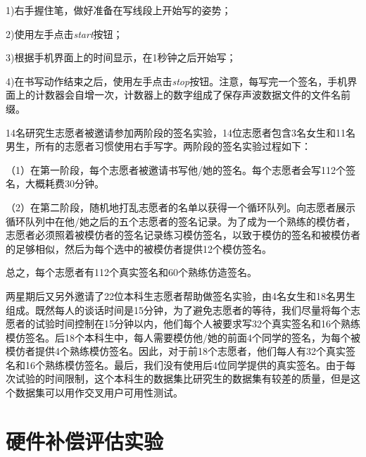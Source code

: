 1)右手握住笔，做好准备在写线段上开始写的姿势；

2)使用左手点击\textit{start}按钮；

3)根据手机界面上的时间显示，在1秒钟之后开始写；

4)在书写动作结束之后，使用左手点击\textit{stop}按钮。注意，每写完一个签名，手机界面上的计数器会自增一次，计数器上的数字组成了保存声波数据文件的文件名前缀。

14名研究生志愿者被邀请参加两阶段的签名实验，14位志愿者包含3名女生和11名男生，所有的志愿者习惯使用右手写字。两阶段的签名实验过程如下：

（1）在第一阶段，每个志愿者被邀请书写他/她的签名。每个志愿者会写112个签名，大概耗费30分钟。

（2）在第二阶段，随机地打乱志愿者的名单以获得一个循环队列。向志愿者展示循环队列中在他/她之后的五个志愿者的签名记录。为了成为一个熟练的模仿者，志愿者必须照着被模仿者的签名记录练习模仿签名，以致于模仿的签名和被模仿者的足够相似，然后为每个选中的被模仿者提供12个模仿签名。

总之，每个志愿者有112个真实签名和60个熟练仿造签名。

两星期后又另外邀请了22位本科生志愿者帮助做签名实验，由4名女生和18名男生组成。既然每人的谈话时间是15分钟，为了避免志愿者的等待，我们尽量将每个志愿者的试验时间控制在15分钟以内，他们每个人被要求写32个真实签名和16个熟练模仿签名。后18个本科生中，每人需要模仿他/她的前面4个同学的签名，为每个被模仿者提供4个熟练模仿签名。因此，对于前18个志愿者，他们每人有32个真实签名和16个熟练模仿签名。最后，我们没有使用后4位同学提供的真实签名。由于每次试验的时间限制，这个本科生的数据集比研究生的数据集有较差的质量，但是这个数据集可以用作交叉用户可用性测试。

\section{硬件补偿评估实验}

